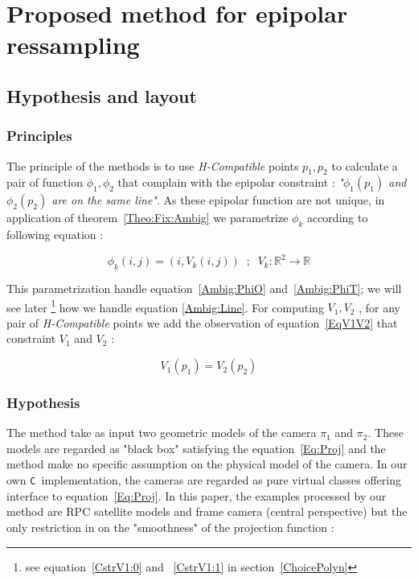 \documentclass[a4paper]{article}
\newcommand{\CPP}{\mbox{\tt C\hspace{-0.05cm}\raisebox{0.2ex}{\small ++} }}
\newcommand{\RR}{\ensuremath{\mathbb{R}}}
\begin{document}

\section{Proposed method for epipolar ressampling}


\subsection{Hypothesis and layout}

\subsubsection{Principles}
The principle of the methods is to use \emph{H-Compatible}  points $p_1,p_2$ to calculate a
pair of function $\phi_1,\phi_2$ that complain with the epipolar constraint :
\emph{"$\phi_1(p_1)$ and $\phi_2(p_2)$ are on the same line"}. As these epipolar function
are not unique, in application of theorem~\ref{Theo:Fix:Ambig} we  parametrize $\phi_k$ according to following equation :


\begin{equation}
    \phi_k(i,j) = (i,V_k(i,j))  \; \; ; \; \;
    V_k : \RR^2 \rightarrow \RR  
  \label{EpipVParam}
\end{equation}

This parametrization handle  equation~\ref{Ambig:PhiO} and~\ref{Ambig:PhiT}; 
we will see later \footnote{see equation~\ref{CstrV1:0} and ~\ref{CstrV1:1} in section~\ref{ChoicePolyn}}
how we handle equation \ref{Ambig:Line}.
For  computing $V_1,V_2$ , for any pair of \emph{H-Compatible} points we add the observation
of equation~\ref{EqV1V2} that constraint $V_1$ and $V_2$ :


\begin{equation}
    V_1(p_1) = V_2(p_2) \label{EqV1V2}
\end{equation}

\subsubsection{Hypothesis}


The method take as input two geometric models of the camera $\pi_1$ and $\pi_2$.
These models are regarded as "black box" satisfying the equation~\ref{Eq:Proj} and the method 
make no specific assumption on the physical model of the camera. In our own \CPP implementation,
the cameras are regarded as pure virtual classes offering interface to equation~\ref{Eq:Proj}.
In this paper, the examples processed by our method are RPC satellite models and frame camera (central perspective) but the
only restriction in on the "smoothness" of the projection function :
\end{document}
